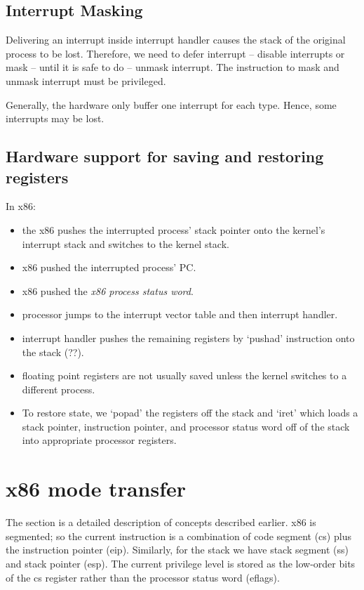 \subsection{Interrupt Masking}
Delivering an interrupt inside interrupt handler causes the stack of the original process to be lost. Therefore, we need to defer interrupt -- disable interrupts or mask -- until it is safe to do -- unmask interrupt. The instruction to mask and unmask interrupt must be privileged. 

Generally, the hardware only buffer one interrupt for each type. Hence, some interrupts may be lost.

\subsection{Hardware support for saving and restoring registers}
In x86:
\begin{itemize}
    \item the x86 pushes the interrupted process' stack pointer onto the kernel's interrupt stack and switches to the kernel stack.
    \item x86 pushed the interrupted process' PC.
    \item  x86 pushed the \textit{x86 process status word}.
    \item processor jumps to the interrupt vector table and then interrupt handler.
    \item interrupt handler pushes the remaining registers by `pushad' instruction onto the stack (??).
    \item floating point registers are not usually saved unless the kernel switches to a different process.
    \item To restore state, we `popad' the registers off the stack and `iret' which loads a stack pointer, instruction pointer, and processor status word off of the stack into appropriate processor registers.
\end{itemize}

\section{x86 mode transfer}
The section is a detailed description of concepts described earlier. x86 is segmented; so the current instruction is a combination of code segment (cs) plus the instruction pointer (eip). Similarly, for the stack we have stack segment (ss) and stack pointer (esp). The current privilege level is stored as the low-order bits of the cs register rather than the processor status word (eflags). 

